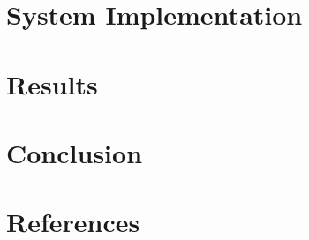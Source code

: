 \documentclass[12pt]{article}
\begin{document}
\section{System Implementation}


\section{Results}


\section{Conclusion}


\section{References}
\end{document}
